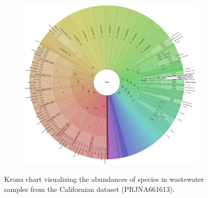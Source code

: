 \begin{figure}[ht!]
\begin{subfigure}[b]{0.3\textwidth}
        \label{fig:results:real:krona-sf-b}
        \end{subfigure}
        \hfill
        \begin{subfigure}[b]{0.3\textwidth}
        \includegraphics[width=1\textwidth]{figures/results/real/krona/krona-sf-all.png}
        \label{fig:results:real:krona-sf-c}
        \end{subfigure}
        \caption{Krona chart visualizing the abundances of species in wastewater samples from the Californian dataset (PRJNA661613).}
    \end{figure}
    
